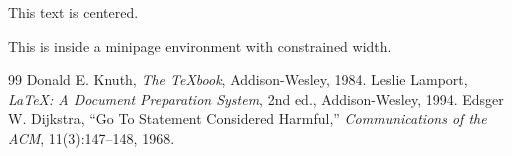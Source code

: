 \documentclass[12pt,twocolumn]{article}
\begin{document}
\begin{center}
This text is centered.
\end{center}

\begin{minipage}{0.8\textwidth}
This is inside a minipage environment with constrained width.
\end{minipage}


\begin{thebibliography}{99}
 Donald E. Knuth, \emph{The \TeX{}book}, Addison-Wesley, 1984.
 Leslie Lamport, \emph{\LaTeX{}: A Document Preparation System}, 2nd ed., Addison-Wesley, 1994.
 Edsger W. Dijkstra, ``Go To Statement Considered Harmful,'' \emph{Communications of the ACM}, 11(3):147--148, 1968.
\end{thebibliography}
\end{document}
